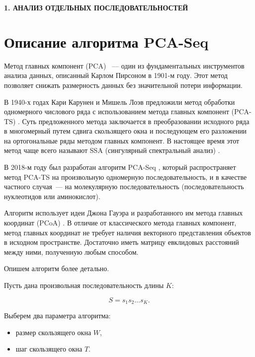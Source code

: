 \newpage
\begin{center}
  \textbf{\large 1. АНАЛИЗ ОТДЕЛЬНЫХ ПОСЛЕДОВАТЕЛЬНОСТЕЙ}
\end{center}

\section{Описание алгоритма PCA-Seq}

Метод главных компонент (PCA) \cite{pearson1901}~--- один из фундаментальных инструментов анализа данных, описанный Карлом Пирсоном в 1901-м году. Этот метод позволяет снижать размерность данных без значительной потери информации.

В 1940-х годах Кари Карунен и Мишель Лоэв предложили метод обработки одномерного числового ряда с использованием метода главных компонент (PCA-TS) \cite{karhunen, loeve}. Суть предложенного метода заключается в преобразовании исходного ряда в многомерный путем сдвига скользящего окна и последующем его разложении на ортогональные ряды методом главных компонент. В настоящее время этот метод чаще всего называют SSA (сингулярный спектральный анализ) \cite{Golyandina2013}.

В 2018-м году был разработан алгоритм PCA-Seq \cite{Efimov2020}, который распространяет метод PCA-TS на произвольную одномерную последовательность, и в качестве частного случая~--- на молекулярную последовательность (последовательность нуклеотидов или аминокислот).

Алгоритм использует идеи Джона Гауэра и разработанного им метода главных координат (PCoA) \cite{Gower1966}. В отличие от классического метода главных компонент, метод главных координат не требует наличия векторного представления объектов в исходном пространстве. Достаточно иметь матрицу евклидовых расстояний между ними, полученную любым способом.

Опишем алгоритм более детально.

Пусть дана произвольная последовательность длины $K$:

$$S = s_1s_2\ldots s_K.$$ 

Выберем два параметра алгоритма:
\begin{itemize}
  \item размер скользящего окна $W$,
  \item шаг скользящего окна $T$.
\end{itemize}

